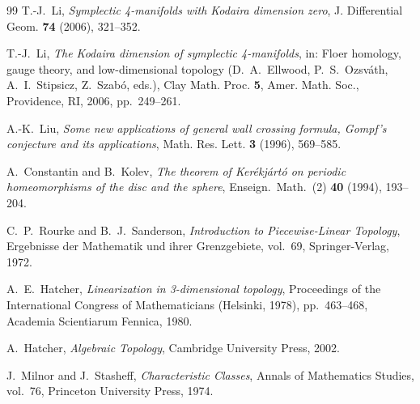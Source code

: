 \documentclass[11pt]{article}
\theoremstyle{definition}
\begin{document}
\begin{thebibliography}{99}
T.-J.~Li,
\emph{Symplectic 4-manifolds with Kodaira dimension zero},
J. Differential Geom. \textbf{74} (2006), 321--352.

T.-J.~Li,
\emph{The Kodaira dimension of symplectic 4-manifolds},
in: Floer homology, gauge theory, and low-dimensional topology
(D.~A.~Ellwood, P.~S.~Ozsv\'ath, A.~I.~Stipsicz, Z.~Szab\'o, eds.),
Clay Math. Proc. \textbf{5}, Amer. Math. Soc., Providence, RI, 2006,
pp.~249--261.

A.-K.~Liu,
\emph{Some new applications of general wall crossing formula, Gompf's
conjecture and its applications},
Math. Res. Lett. \textbf{3} (1996), 569--585.

A.~Constantin and B.~Kolev,
\emph{The theorem of Ker\'ekj\'art\'o on periodic homeomorphisms of the
disc and the sphere},
Enseign.\ Math.\ (2) \textbf{40} (1994), 193--204.

C.~P.~Rourke and B.~J.~Sanderson,
\emph{Introduction to Piecewise-Linear Topology},
Ergebnisse der Mathematik und ihrer Grenzgebiete, vol.~69,
Springer-Verlag, 1972.

A.~E.~Hatcher,
\emph{Linearization in 3-dimensional topology},
Proceedings of the International Congress of Mathematicians
(Helsinki, 1978), pp.~463--468, Academia Scientiarum Fennica, 1980.

A.~Hatcher,
\emph{Algebraic Topology}, Cambridge University Press, 2002.

J.~Milnor and J.~Stasheff,
\emph{Characteristic Classes}, Annals of Mathematics Studies, vol.~76,
Princeton University Press, 1974.

\end{thebibliography}
\endgroup
\end{document}
